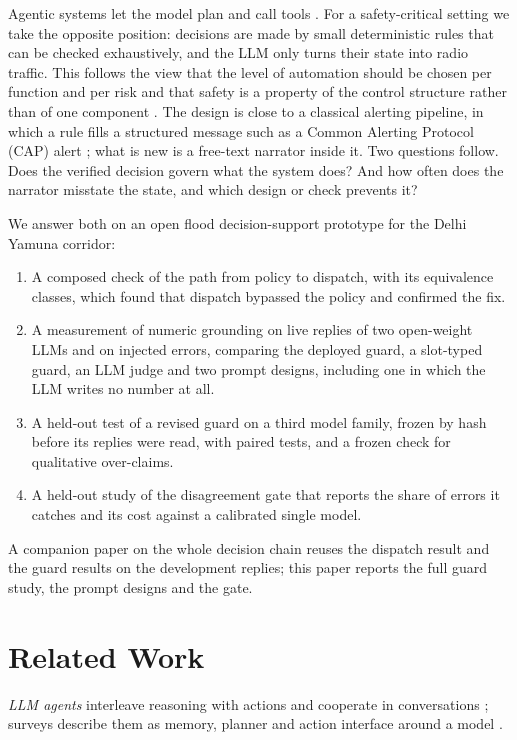 \documentclass[conference]{IEEEtran}
\begin{document}
Agentic systems let the model plan and call tools \cite{Yao2023,Wu2024}. For a safety-critical setting we take the opposite position: decisions are made by small deterministic rules that can be checked exhaustively, and the LLM only turns their state into radio traffic. This follows the view that the level of automation should be chosen per function and per risk \cite{Parasuraman2000} and that safety is a property of the control structure rather than of one component \cite{Leveson2011}. The design is close to a classical alerting pipeline, in which a rule fills a structured message such as a Common Alerting Protocol (CAP) alert \cite{CAP2010}; what is new is a free-text narrator inside it. Two questions follow. Does the verified decision govern what the system does? And how often does the narrator misstate the state, and which design or check prevents it?

We answer both on an open flood decision-support prototype for the Delhi Yamuna corridor:
\begin{enumerate}
\item A composed check of the path from policy to dispatch, with its equivalence classes, which found that dispatch bypassed the policy and confirmed the fix.
\item A measurement of numeric grounding on \LiveN{} live replies of two open-weight LLMs and on injected errors, comparing the deployed guard, a slot-typed guard, an LLM judge and two prompt designs, including one in which the LLM writes no number at all.
\item A held-out test of a revised guard on a third model family, frozen by hash before its replies were read, with paired tests, and a frozen check for qualitative over-claims.
\item A held-out study of the disagreement gate that reports the share of errors it catches and its cost against a calibrated single model.
\end{enumerate}
A companion paper on the whole decision chain reuses the dispatch result and the guard results on the development replies; this paper reports the full guard study, the prompt designs and the gate.

\section{Related Work}
\textit{LLM agents} interleave reasoning with actions \cite{Yao2023} and cooperate in conversations \cite{Wu2024}; surveys describe them as memory, planner and action interface around a model \cite{WangL2024}.
\end{document}
